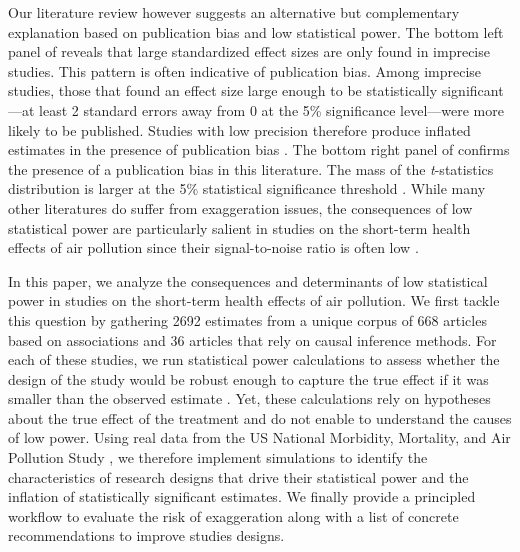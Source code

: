 \documentclass[12pt]{article}
\begin{document}
    Our literature review however suggests an alternative but complementary explanation based on publication bias and low statistical power. The bottom left panel of  reveals that large standardized effect sizes are only found in imprecise studies. This pattern is often indicative of publication bias. Among imprecise studies, those that found an effect size large enough to be statistically significant---at least 2 standard errors away from 0 at the 5\% significance level---were more likely to be published. Studies with low precision therefore produce inflated estimates in the presence of publication bias \citep{ioannidis_why_2008, gelman_beyond_2014}. The bottom right panel of  confirms the presence of a publication bias in this literature. The mass of the \textit{t}-statistics distribution is larger at the 5\% statistical significance threshold \citep{brodeur_star_2016, brodeur_methods_2020}. While many other literatures do suffer from exaggeration issues, the consequences of low statistical power are particularly salient in studies on the short-term health effects of air pollution since their signal-to-noise ratio is often low \citep{peng2006model, peng2008statistical}.

    In this paper, we analyze the consequences and determinants of low statistical power in studies on the short-term health effects of air pollution. We first tackle this question by gathering 2692 estimates from a unique corpus of 668 articles based on associations and 36 articles that rely on causal inference methods. For each of these studies, we run statistical power calculations to assess whether the design of the study would be robust enough to capture the true effect if it was smaller than the observed estimate \citep{gelman_beyond_2014, ioannidis_power_2017, lu_note_2019, timm_retrodesign_2019}. Yet, these calculations rely on hypotheses about the true effect of the treatment and do not enable to understand the causes of low power. Using real data from the US National Morbidity, Mortality, and Air Pollution Study \citep{samet2000national}, we therefore implement simulations to identify the characteristics of research designs that drive their statistical power and the inflation of statistically significant estimates. We finally provide a principled workflow to evaluate the risk of exaggeration along with a list of concrete recommendations to improve studies designs.
    
\end{document}
